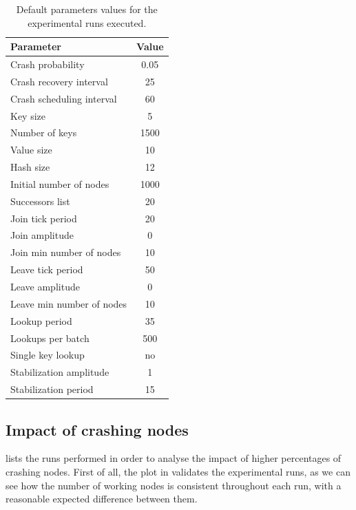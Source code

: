 \documentclass[11pt,twocolumn,letterpaper]{article}
\begin{document}
	\begin{table}[!ht]
		\caption{Default parameters values for the experimental runs executed.}
		\label{tab:default_params}
		\centering
		\begin{tabular}{lc}
			\hline
			\textbf{Parameter} & \textbf{Value} \\
			\hline
			Crash probability & 0.05\\
			\hline
			Crash recovery interval & 25\\
			\hline
			Crash scheduling interval & 60\\
			\hline
			Key size & 5 \\
			\hline
			Number of keys & 1500\\
			\hline
			Value size & 10\\
			\hline
			Hash size & 12\\
			\hline
			Initial number of nodes & 1000\\
			\hline
			Successors list & 20\\
			\hline
			Join tick period & 20\\
			\hline
			Join amplitude & 0\\
			\hline
			Join min number of nodes & 10\\
			\hline
			Leave tick period & 50\\
			\hline
			Leave amplitude & 0\\
			\hline
			Leave min number of nodes & 10\\
			\hline
			Lookup period & 35\\
			\hline
			Lookups per batch & 500\\
			\hline
			Single key lookup & no\\
			\hline
			Stabilization amplitude & 1\\
			\hline
			Stabilization period & 15\\
			\hline
		\end{tabular}
	\end{table}
	
	\subsection{Impact of crashing nodes}
	\label{subsec:crash_analysis}
		 lists the runs performed in order to analyse the impact of higher percentages of crashing nodes. First of all, the plot in  validates the experimental runs, as we can see how the number of working nodes is consistent throughout each run, with a reasonable expected difference between them. 
						
\end{document}
